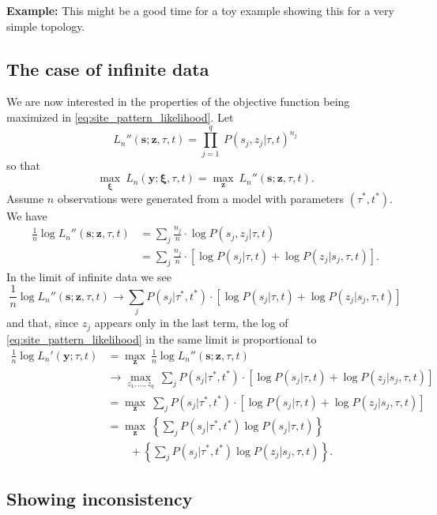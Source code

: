 \documentclass[a4paper]{article}
\begin{document}
\textbf{Example:} This might be a good time for a toy example showing this for a very simple topology.

\subsection{The case of infinite data}

We are now interested in the properties of the objective function being maximized in \eqref{eq:site_pattern_likelihood}.
Let
$$
L_n''(\mathbf{s};\mathbf{z},\tau,t) = \prod_{j=1}^q \ P(s_j, z_j | \tau, t)^{n_j}
$$
so that
$$
\max_{\boldsymbol\xi} \ L_n(\mathbf{y};\boldsymbol\xi, \tau, t) = \max_{\mathbf{z}} \ L_n''(\mathbf{s};\mathbf{z},\tau,t).
$$
Assume $n$ observations were generated from a model with parameters $(\tau^*, t^*)$.
We have
\begin{align}
\frac{1}{n} \log L_n''(\mathbf{s};\mathbf{z},\tau,t) &= \sum_{j} \frac{n_j}{n}\cdot \log P(s_j, z_j | \tau, t) \\
  &= \sum_{j} \frac{n_j}{n}\cdot [\log P(s_j | \tau, t) + \log P(z_j | s_j, \tau, t)].
\end{align}
In the limit of infinite data we see
$$
\frac{1}{n} \log L_n''(\mathbf{s};\mathbf{z},\tau,t) \rightarrow \sum_{j} P(s_j | \tau^*, t^*) \cdot [\log P(s_j | \tau, t) + \log P(z_j | s_j, \tau, t)]
$$
and that, since $z_j$ appears only in the last term, the log of \eqref{eq:site_pattern_likelihood} in the same limit is proportional to
\begin{align}
\frac{1}{n} \log L_n'(\mathbf{y};\tau, t) &= \max_{\mathbf{z}} \ \frac{1}{n} \log L_n''(\mathbf{s};\mathbf{z},\tau,t) \nonumber \\
    &\rightarrow \max_{z_1, \ldots, z_q} \ \sum_{j} P(s_j | \tau^*, t^*) \cdot [\log P(s_j | \tau, t) + \log P(z_j | s_j, \tau, t)] \nonumber \\
    &= \max_{\mathbf{z}} \ \sum_{j} P(s_j | \tau^*, t^*) \cdot [\log P(s_j | \tau, t) + \log P(z_j | s_j, \tau, t)] \nonumber \\
    &= \max_{\mathbf{z}} \ \left\{\sum_{j} P(s_j | \tau^*, t^*) \log P(s_j | \tau, t)\right\} \nonumber \\
    &\qquad + \left\{\sum_{j} P(s_j | \tau^*, t^*) \log P(z_j | s_j, \tau, t)\right\}. \label{eq:site_pattern_profile_likelihood_mean}
\end{align}

\subsection{Showing inconsistency}
\end{document}
